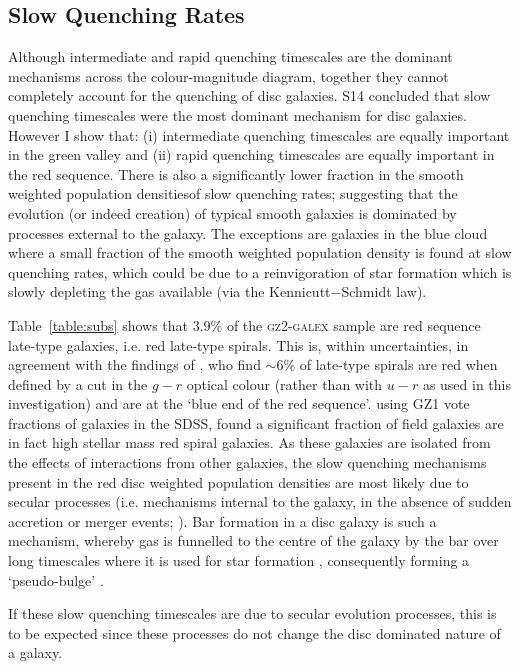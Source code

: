 \subsection{Slow Quenching Rates}\label{slow}
Although intermediate and rapid quenching timescales are the dominant mechanisms across the colour-magnitude diagram, together they cannot completely account for the quenching of disc galaxies. S14 concluded that slow quenching timescales were the most dominant mechanism for disc galaxies. However I show that: (i) intermediate quenching timescales are equally important in the green valley and (ii) rapid quenching timescales are equally important in the red sequence. There is also a significantly lower fraction in the smooth weighted population densitiesof slow quenching rates; suggesting that the evolution (or indeed creation) of typical smooth galaxies is dominated by processes external to the galaxy. The exceptions are galaxies in the blue cloud where a small fraction of the smooth weighted population density is found at slow quenching rates, which could be due to a reinvigoration of star formation which is slowly depleting the gas available (via the Kennicutt$-$Schmidt law).

Table~\ref{table:subs} shows that $3.9\%$ of the \textsc{gz2-galex} sample are red sequence late-type galaxies, i.e. red late-type spirals. This is, within uncertainties, in agreement with the findings of \citet{masters10c}, who find $\sim6\%$ of late-type spirals are red when defined by a cut in the $g-r$ optical colour (rather than with $u-r$ as used in this investigation) and are at the `blue end of the red sequence'. \citet{Bamford09} using GZ1 vote fractions of galaxies in the SDSS, found a significant fraction of field galaxies are in fact high stellar mass red spiral galaxies. As these galaxies are isolated from the effects of interactions from other galaxies, the slow quenching mechanisms present in the red disc weighted population densities are most likely due to secular processes (i.e. mechanisms internal to the galaxy, in the absence of sudden accretion or merger events; \citealt{kormendy04, Sheth12}). Bar formation in a disc galaxy is such a mechanism, whereby gas is funnelled to the centre of the galaxy by the bar over long timescales where it is used for star formation \citep{masters12a, saintonge12, Cheung13}, consequently forming a `pseudo-bulge' \citep{Kormendy10, Simmons13}.

If these slow quenching timescales are due to secular evolution processes, this is to be expected since these processes do not change the disc dominated nature of a galaxy. 

